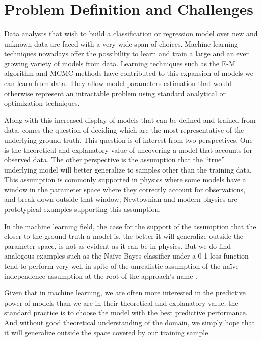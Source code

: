 \label{sec:Introduction} 

\section{Problem Definition and Challenges}
\paragraph{}

Data analysts that wish to build a classification or regression model over new and unknown data are faced with a very wide span of choices.  Machine learning techniques nowadays offer the possibility to learn and train a large and an ever growing variety of models from data.  Learning techniques such as the E-M algorithm and MCMC methods have contributed to this expansion of models we can learn from data.  They allow model parameters estimation that would otherwise represent an intractable problem using standard analytical or optimization techniques.

Along with this increased display of models that can be defined and trained from data, comes the question of deciding which are the most representative of the underlying ground truth.  This question is of interest from two perspectives.  One is the theoretical and explanatory value of uncovering a model that accounts for observed data.  The other perspective is the assumption that the ``true'' underlying model will better generalize to samples other than the training data.  This assumption is commonly supported in physics where some models have a window in the parameter space where they correctly account for observations, and break down outside that window; Newtownian and modern physics are prototypical examples supporting this assumption.  

In the machine learning field, the case for the support of the assumption that the closer to the ground truth a model is, the better it will generalize outside the parameter space, is not as evident as it can be in physics. But we do find analogous examples such as the Naïve Bayes classifier under a 0-1 loss function tend to perform very well in spite of the unrealistic assumption of the naïve independence assumption at the root of the approach's name \citep{domingos1997optimality}.

Given that in machine learning, we are often more interested in the predictive power of models than we are in their theoretical and explanatory value, the standard practice is to choose the model with the best predictive performance.  And without good theoretical understanding of the domain, we simply hope that it will generalize outside the space covered by our training sample.  

